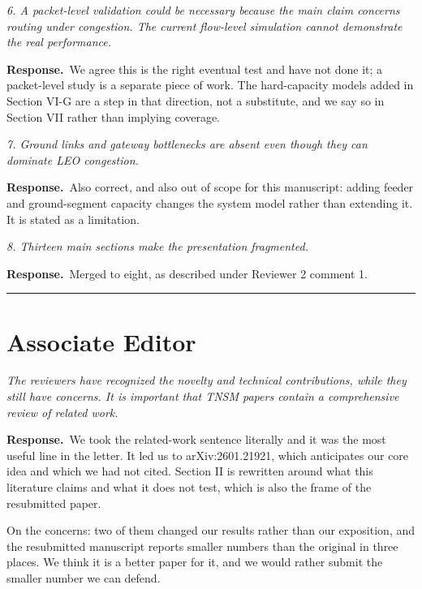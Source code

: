 \documentclass[11pt]{article}
\newcommand{\rc}[1]{\medskip\noindent\textit{\textcolor{black!65}{#1}}\par\smallskip}
\newcommand{\ans}{\noindent\textbf{Response.}\ }
\begin{document}
\rc{6. A packet-level validation could be necessary because the main claim concerns routing under
congestion. The current flow-level simulation cannot demonstrate the real performance.}
\ans We agree this is the right eventual test and have not done it; a packet-level study is a
separate piece of work. The hard-capacity models added in Section VI-G are a step in that
direction, not a substitute, and we say so in Section VII rather than implying coverage.

\rc{7. Ground links and gateway bottlenecks are absent even though they can dominate LEO
congestion.}
\ans Also correct, and also out of scope for this manuscript: adding feeder and ground-segment
capacity changes the system model rather than extending it. It is stated as a limitation.

\rc{8. Thirteen main sections make the presentation fragmented.}
\ans Merged to eight, as described under Reviewer 2 comment 1.

\hrule
\section*{Associate Editor}

\rc{The reviewers have recognized the novelty and technical contributions, while they still have
concerns. It is important that TNSM papers contain a comprehensive review of related work.}
\ans We took the related-work sentence literally and it was the most useful line in the letter. It
led us to arXiv:2601.21921, which anticipates our core idea and which we had not cited. Section II
is rewritten around what this literature claims and what it does not test, which is also the frame
of the resubmitted paper.

On the concerns: two of them changed our results rather than our exposition, and the resubmitted
manuscript reports smaller numbers than the original in three places. We think it is a better
paper for it, and we would rather submit the smaller number we can defend.
\end{document}
